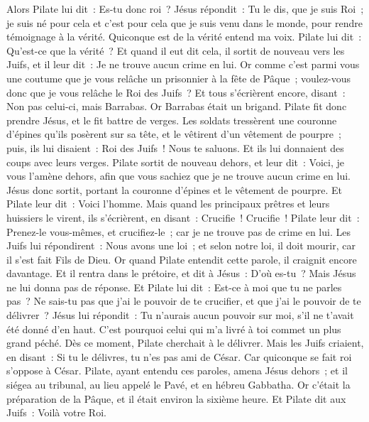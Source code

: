 \begin{multicols}{2}
Alors Pilate lui dit~: Es-tu donc roi~? Jésus répondit~: Tu le dis, que je suis Roi~; je suis né pour cela et c'est pour cela que je suis venu dans le monde, pour rendre témoignage à la vérité. Quiconque est de la vérité entend ma voix.
Pilate lui dit~: Qu'est-ce que la vérité~? Et quand il eut dit cela, il sortit de nouveau vers les Juifs, et il leur dit~: Je ne trouve aucun crime en lui.
Or comme c'est parmi vous une coutume que je vous relâche un prisonnier à la fête de Pâque~; voulez-vous donc que je vous relâche le Roi des Juifs~?
Et tous s'écrièrent encore, disant~: Non pas celui-ci, mais Barrabas. Or Barrabas était un brigand.
\VerseOne{}Pilate fit donc prendre Jésus, et le fit battre de verges.
Les soldats tressèrent une couronne d'épines qu'ils posèrent sur sa tête, et le vêtirent d'un vêtement de pourpre~;
puis, ils lui disaient~: Roi des Juifs~! Nous te saluons. Et ils lui donnaient des coups avec leurs verges.
Pilate sortit de nouveau dehors, et leur dit~: Voici, je vous l'amène dehors, afin que vous sachiez que je ne trouve aucun crime en lui.
Jésus donc sortit, portant la couronne d'épines et le vêtement de pourpre. Et Pilate leur dit~: Voici l'homme.
Mais quand les principaux prêtres et leurs huissiers le virent, ils s'écrièrent, en disant~: Crucifie~! Crucifie~! Pilate leur dit~: Prenez-le vous-mêmes, et crucifiez-le~; car je ne trouve pas de crime en lui.
Les Juifs lui répondirent~: Nous avons une loi~; et selon notre loi, il doit mourir, car il s'est fait Fils de Dieu.
Or quand Pilate entendit cette parole, il craignit encore davantage.
Et il rentra dans le prétoire, et dit à Jésus~: D'où es-tu~? Mais Jésus ne lui donna pas de réponse.
Et Pilate lui dit~: Est-ce à moi que tu ne parles pas~? Ne sais-tu pas que j'ai le pouvoir de te crucifier, et que j'ai le pouvoir de te délivrer~?
Jésus lui répondit~: Tu n'aurais aucun pouvoir sur moi, s'il ne t'avait été donné d'en haut. C'est pourquoi celui qui m'a livré à toi commet un plus grand péché.
Dès ce moment, Pilate cherchait à le délivrer. Mais les Juifs criaient, en disant~: Si tu le délivres, tu n'es pas ami de César. Car quiconque se fait roi s'oppose à César.
Pilate, ayant entendu ces paroles, amena Jésus dehors~; et il siégea au tribunal, au lieu appelé le Pavé, et en hébreu Gabbatha.
Or c'était la préparation de la Pâque, et il était environ la sixième heure. Et Pilate dit aux Juifs~: Voilà votre Roi.

\end{multicols}

